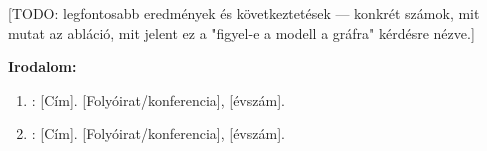 \documentclass[12pt]{article}
\begin{document}
[TODO: legfontosabb eredmények és következtetések — konkrét számok,
mit mutat az abláció, mit jelent ez a "figyel-e a modell a gráfra"
kérdésre nézve.]

\vspace{1em}

\textbf{Irodalom:}
\begin{enumerate}[leftmargin=1.5em]
    \item [Szerző]: [Cím]. [Folyóirat/konferencia], [évszám].
    \item [Szerző]: [Cím]. [Folyóirat/konferencia], [évszám].
\end{enumerate}
\end{document}
